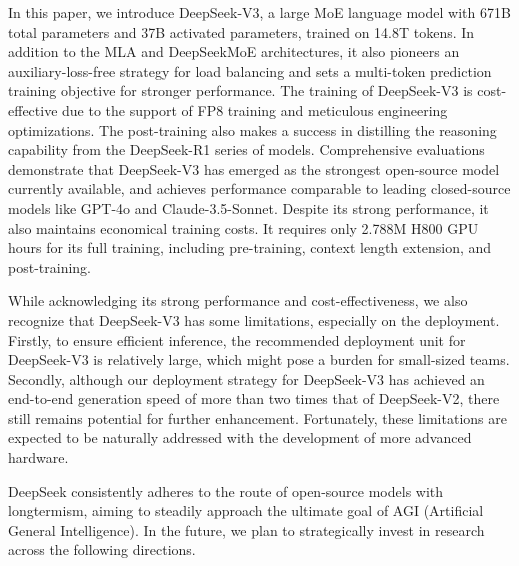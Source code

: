 \documentclass[11pt,a4paper]{article}
\begin{document}
In this paper, we introduce DeepSeek-V3, a large MoE language model with 671B total parameters and 37B activated parameters, trained on 14.8T tokens. In addition to the MLA and DeepSeekMoE architectures, it also pioneers an auxiliary-loss-free strategy for load balancing and sets a multi-token prediction training objective for stronger performance. The training of DeepSeek-V3 is cost-effective due to the support of FP8 training and meticulous engineering optimizations. The post-training also makes a success in distilling the reasoning capability from the DeepSeek-R1 series of models. Comprehensive evaluations demonstrate that DeepSeek-V3 has emerged as the strongest open-source model currently available, and achieves performance comparable to leading closed-source models like GPT-4o and Claude-3.5-Sonnet. Despite its strong performance, it also maintains economical training costs. It requires only 2.788M H800 GPU hours for its full training, including pre-training, context length extension, and post-training.

While acknowledging its strong performance and cost-effectiveness, we also recognize that DeepSeek-V3 has some limitations, especially on the deployment. Firstly, to ensure efficient inference, the recommended deployment unit for DeepSeek-V3 is relatively large, which might pose a burden for small-sized teams. Secondly, although our deployment strategy for DeepSeek-V3 has achieved an end-to-end generation speed of more than two times that of DeepSeek-V2, there still remains potential for further enhancement. Fortunately, these limitations are expected to be naturally addressed with the development of more advanced hardware.

DeepSeek consistently adheres to the route of open-source models with longtermism, aiming to steadily approach the ultimate goal of AGI (Artificial General Intelligence). In the future, we plan to strategically invest in research across the following directions.
\end{document}
